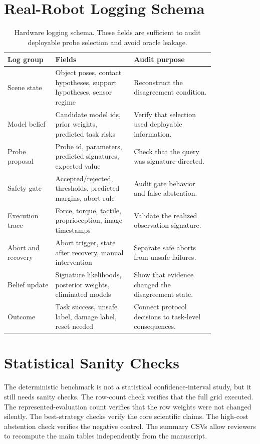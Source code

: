 \documentclass{article}
\begin{document}
\section{Real-Robot Logging Schema}

\begin{table}[p]
\centering
\small
\begin{tabular}{p{0.19\linewidth}p{0.31\linewidth}p{0.32\linewidth}}
\toprule
Log group & Fields & Audit purpose \\
\midrule
Scene state & Object poses, contact hypotheses, support hypotheses, sensor regime & Reconstruct the disagreement condition. \\
Model belief & Candidate model ids, prior weights, predicted task risks & Verify that selection used deployable information. \\
Probe proposal & Probe id, parameters, predicted signatures, expected value & Check that the query was signature-directed. \\
Safety gate & Accepted/rejected, thresholds, predicted margins, abort rule & Audit gate behavior and false abstention. \\
Execution trace & Force, torque, tactile, proprioception, image timestamps & Validate the realized observation signature. \\
Abort and recovery & Abort trigger, state after recovery, manual intervention & Separate safe aborts from unsafe failures. \\
Belief update & Signature likelihoods, posterior weights, eliminated models & Show that evidence changed the disagreement state. \\
Outcome & Task success, unsafe label, damage label, reset needed & Connect protocol decisions to task-level consequences. \\
\bottomrule
\end{tabular}
\caption{Hardware logging schema. These fields are sufficient to audit deployable probe selection and avoid oracle leakage.}
\label{tab:hardware_logging}
\end{table}

\section{Statistical Sanity Checks}

The deterministic benchmark is not a statistical confidence-interval study, but it still needs sanity checks. The row-count check verifies that the full grid executed. The represented-evaluation count verifies that the row weights were not changed silently. The best-strategy checks verify the core scientific claims. The high-cost abstention check verifies the negative control. The summary CSVs allow reviewers to recompute the main tables independently from the manuscript.
\end{document}
